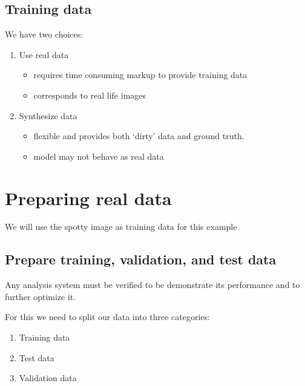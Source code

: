 \documentclass[letterpaper,10pt,english]{sphinxmanual}
\begin{document}
\subsection{Training data}
\label{\detokenize{ML4NeutronImageSegmentation:training-data}}
We have two choices:
\begin{enumerate}
%
\item {} 
Use real data
\begin{itemize}
\item {} 
requires time consuming markup to provide training data

\item {} 
corresponds to real life images

\end{itemize}

\item {} 
Synthesize data
\begin{itemize}
\item {} 
flexible and provides both ‘dirty’ data and ground truth.

\item {} 
model may not behave as real data

\end{itemize}

\end{enumerate}


\section{Preparing real data}
\label{\detokenize{ML4NeutronImageSegmentation:preparing-real-data}}
We will use the spotty image as training data for this example


\subsection{Prepare training, validation, and test data}
\label{\detokenize{ML4NeutronImageSegmentation:prepare-training-validation-and-test-data}}
Any analysis system must be verified to be demonstrate its performance and to further optimize it.

For this we need to split our data into three categories:
\begin{enumerate}
%
\item {} 
Training data

\item {} 
Test data

\item {} 
Validation data

\end{enumerate}
\end{document}
